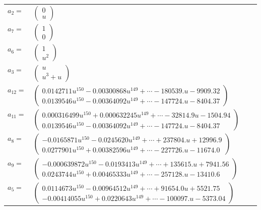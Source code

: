 \documentclass[1p]{elsarticle_modified}
\theoremstyle{definition}
\begin{document}
\begin{tabular}{m{7pt} m{180pt} m{7pt} m{180pt} }
\flushright $a_{2}=$&$\begin{pmatrix}0\\u\end{pmatrix}$ \\
\flushright $a_{7}=$&$\begin{pmatrix}1\\0\end{pmatrix}$ \\
\flushright $a_{6}=$&$\begin{pmatrix}1\\u^2\end{pmatrix}$ \\
\flushright $a_{3}=$&$\begin{pmatrix}u\\u^3+u\end{pmatrix}$ \\
\flushright $a_{12}=$&$\begin{pmatrix}0.0142711 u^{150}-0.00300868 u^{149}+\cdots-180539. u-9909.32\\0.0139546 u^{150}-0.00364092 u^{149}+\cdots-147724. u-8404.37\end{pmatrix}$ \\
\flushright $a_{11}=$&$\begin{pmatrix}0.000316499 u^{150}+0.000632245 u^{149}+\cdots-32814.9 u-1504.94\\0.0139546 u^{150}-0.00364092 u^{149}+\cdots-147724. u-8404.37\end{pmatrix}$ \\
\flushright $a_{8}=$&$\begin{pmatrix}-0.0165871 u^{150}-0.0245620 u^{149}+\cdots+237804. u+12996.9\\0.0277901 u^{150}+0.00382596 u^{149}+\cdots-227726. u-11674.0\end{pmatrix}$ \\
\flushright $a_{9}=$&$\begin{pmatrix}-0.000639872 u^{150}-0.0193413 u^{149}+\cdots+135615. u+7941.56\\0.0243744 u^{150}+0.00465333 u^{149}+\cdots-257128. u-13410.6\end{pmatrix}$ \\
\flushright $a_{5}=$&$\begin{pmatrix}0.0114673 u^{150}-0.00964512 u^{149}+\cdots+91654.0 u+5521.75\\-0.00414055 u^{150}+0.0220643 u^{149}+\cdots-100097. u-5373.04\end{pmatrix}$ \\

\end{tabular}
\end{document}
